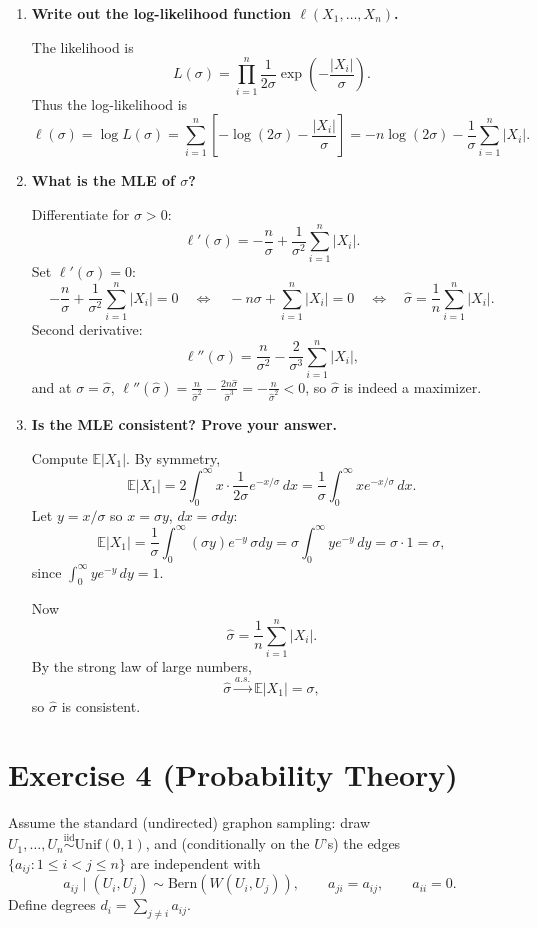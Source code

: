 \documentclass[11pt]{article}
\newcommand{\E}{\mathbb{E}}
\newcommand{\iid}{\stackrel{\mathrm{iid}}{\sim}}
\newcommand{\Unif}{\mathrm{Unif}}
\newcommand{\Bern}{\mathrm{Bern}}
\begin{document}
\begin{enumerate}[label=(\alph*)]
\item \textbf{Write out the log-likelihood function $\ell(X_1,\dots,X_n)$.}

The likelihood is
\[
L(\sigma)=\prod_{i=1}^n \frac{1}{2\sigma}\exp\!\left(-\frac{|X_i|}{\sigma}\right).
\]
Thus the log-likelihood is
\[
\ell(\sigma)=\log L(\sigma)
= \sum_{i=1}^n\left[-\log(2\sigma)-\frac{|X_i|}{\sigma}\right]
= -n\log(2\sigma)-\frac{1}{\sigma}\sum_{i=1}^n |X_i|.
\]

\item \textbf{What is the MLE of $\sigma$?}

Differentiate for $\sigma>0$:
\[
\ell'(\sigma)= -\frac{n}{\sigma}+\frac{1}{\sigma^2}\sum_{i=1}^n |X_i|.
\]
Set $\ell'(\sigma)=0$:
\[
-\frac{n}{\sigma}+\frac{1}{\sigma^2}\sum_{i=1}^n |X_i|=0
\quad\Longleftrightarrow\quad
-n\sigma+\sum_{i=1}^n|X_i|=0
\quad\Longleftrightarrow\quad
\hat\sigma=\frac1n\sum_{i=1}^n |X_i|.
\]
Second derivative:
\[
\ell''(\sigma)=\frac{n}{\sigma^2}-\frac{2}{\sigma^3}\sum_{i=1}^n |X_i|,
\]
and at $\sigma=\hat\sigma$, $\ell''(\hat\sigma)=\frac{n}{\hat\sigma^2}-\frac{2n\hat\sigma}{\hat\sigma^3}=-\frac{n}{\hat\sigma^2}<0$, so $\hat\sigma$ is indeed a maximizer.

\item \textbf{Is the MLE consistent? Prove your answer.}

Compute $\E|X_1|$. By symmetry,
\[
\E|X_1|
=2\int_0^\infty x\cdot \frac{1}{2\sigma}e^{-x/\sigma}\,dx
=\frac{1}{\sigma}\int_0^\infty x e^{-x/\sigma}\,dx.
\]
Let $y=x/\sigma$ so $x=\sigma y$, $dx=\sigma dy$:
\[
\E|X_1|
=\frac{1}{\sigma}\int_0^\infty (\sigma y)e^{-y}\,\sigma dy
=\sigma\int_0^\infty y e^{-y}\,dy
=\sigma\cdot 1
=\sigma,
\]
since $\int_0^\infty y e^{-y}\,dy=1$.

Now
\[
\hat\sigma=\frac{1}{n}\sum_{i=1}^n |X_i|.
\]
By the strong law of large numbers,
\[
\hat\sigma \xrightarrow{a.s.} \E|X_1|=\sigma,
\]
so $\hat\sigma$ is consistent.
\end{enumerate}

\section*{Exercise 4 (Probability Theory)}

Assume the standard (undirected) graphon sampling: draw $U_1,\dots,U_n \iid \Unif(0,1)$, and (conditionally on the $U$'s) the edges $\{a_{ij}:1\le i<j\le n\}$ are independent with
\[
a_{ij}\mid (U_i,U_j)\sim \Bern(W(U_i,U_j)),\qquad a_{ji}=a_{ij},\qquad a_{ii}=0.
\]
Define degrees $d_i=\sum_{j\ne i} a_{ij}$.
\end{document}
